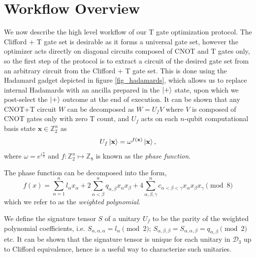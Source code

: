 \documentclass[titlepage]{article}
\theoremstyle{definition}
\theoremstyle{problem}
\theoremstyle{lemma}
\begin{document}
	\FloatBarrier		
		
	\section{Workflow Overview}
		\label{sec_methods}
		\iffalse
		We now describe the high level workflow of our T gate optimization protocol. The Clifford + T gate set is desirable as it forms a universal gate set, however the optimizer acts directly on diagonal circuits composed of CNOT and T gates only, so the first step of the protocol is to extract a circuit of the desired gate set from an arbitrary circuit from the Clifford + T gate set. This is done using the Hadamard gadget depicted in figure \ref{fig_hadamards}, which allows us to replace internal Hadamards with an ancilla prepared in the $\left\vert{+}\right\rangle$ state, upon which we post-select the $\left\vert{+}\right\rangle$ outcome at the end of execution. It can be shown that any CNOT+T circuit $W$ can be decomposed as $W=U_fV$ where $V$ is composed of CNOT gates only with zero T count, and $U_f$ acts on each $n$-qubit computational basis state $\mathbf{x}\in \mathbb{Z}_2^n$ as
		\begin{equation}
			U_f\left\vert{\mathbf{x}}\right\rangle = \omega^{f(\mathbf{x})}\left\vert{\mathbf{x}}\right\rangle,
		\end{equation}
		where $\omega = e^{i\frac{\pi}{4}}$ and $f:\mathbb{Z}_2^n \mapsto \mathbb{Z}_8$ is known as the \emph{phase function}.

		The phase function can be decomposed into the form,
		\begin{equation}
		f(x) = \sum_{\alpha=1}^{n}l_{\alpha}x_\alpha + 2\sum_{\alpha<\beta}^{n} q_{\alpha,\beta}x_\alpha x_\beta + 4\sum_{\alpha,\beta,\gamma}^{n}c_{\alpha<\beta<\gamma}x_\alpha x_\beta x_\gamma \pmod{8}
		\end{equation}
		which we refer to as the \emph{weighted polynomial}.
		
		We define the signature tensor $S$ of a unitary $U_f$ to be the parity of the weighted polynomial coefficients, i.e. $S_{\alpha,\alpha,\alpha} = l_{\alpha} \pmod{2}$; $S_{\alpha,\beta,\beta} = S_{\alpha,\alpha,\beta} = q_{\alpha,\beta} \pmod{2}$ etc.
		It can be shown that the signature tensor is unique for each unitary in $\mathcal{D}_3$ up to Clifford equivalence, hence is a useful way to characterize such unitaries. %
		
			
\end{document}
